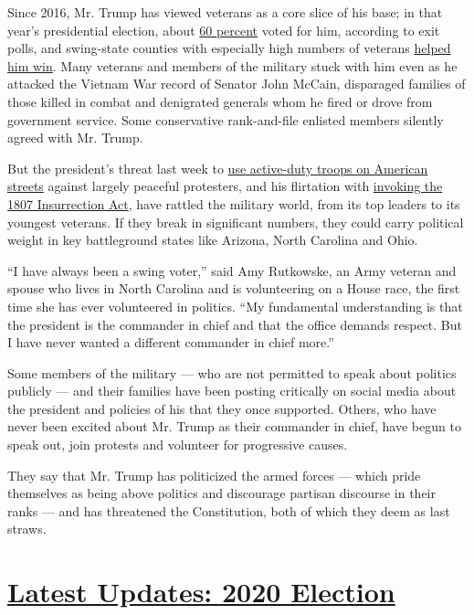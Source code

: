 Since 2016, Mr. Trump has viewed veterans as a core slice of his base;
in that year's presidential election, about
\href{https://www.cnn.com/election/2016/results/exit-polls/national/president}{60
percent} voted for him, according to exit polls, and swing-state
counties with especially high numbers of veterans
\href{https://www.washingtonpost.com/news/checkpoint/wp/2016/11/10/how-swing-state-veterans-played-a-key-role-in-donald-trump-winning-the-white-house/}{helped
him win}. Many veterans and members of the military stuck with him even
as he attacked the Vietnam War record of Senator John McCain, disparaged
families of those killed in combat and denigrated generals whom he fired
or drove from government service. Some conservative rank-and-file
enlisted members silently agreed with Mr. Trump.

But the president's threat last week to
\href{https://www.nytimes.com/2020/06/04/us/politics/trump-military-protests.html}{use
active-duty troops on American streets} against largely peaceful
protesters, and his flirtation with
\href{https://www.nytimes.com/article/insurrection-act.html}{invoking
the 1807 Insurrection Act}, have rattled the military world, from its
top leaders to its youngest veterans. If they break in significant
numbers, they could carry political weight in key battleground states
like Arizona, North Carolina and Ohio.

``I have always been a swing voter,'' said Amy Rutkowske, an Army
veteran and spouse who lives in North Carolina and is volunteering on a
House race, the first time she has ever volunteered in politics. ``My
fundamental understanding is that the president is the commander in
chief and that the office demands respect. But I have never wanted a
different commander in chief more.''

Some members of the military --- who are not permitted to speak about
politics publicly --- and their families have been posting critically on
social media about the president and policies of his that they once
supported. Others, who have never been excited about Mr. Trump as their
commander in chief, have begun to speak out, join protests and volunteer
for progressive causes.

They say that Mr. Trump has politicized the armed forces --- which pride
themselves as being above politics and discourage partisan discourse in
their ranks --- and has threatened the Constitution, both of which they
deem as last straws.

\hypertarget{latest-updates-2020-election}{%
\section{\texorpdfstring{\href{https://www.nytimes.com/2020/07/31/us/elections/biden-vs-trump.html?action=click\&pgtype=Article\&state=default\&region=MAIN_CONTENT_1\&context=storylines_live_updates}{Latest
Updates: 2020
Election}}{Latest Updates: 2020 Election}}\label{latest-updates-2020-election}}

